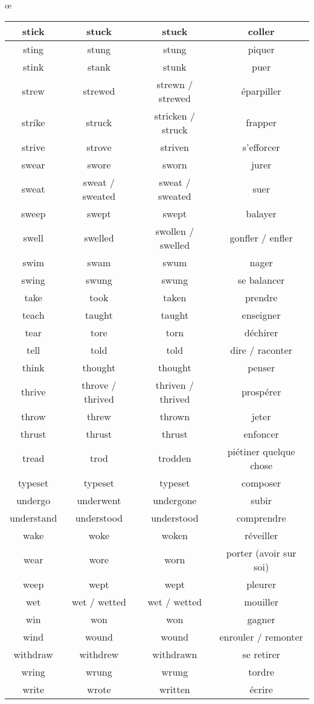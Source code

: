 œ\documentclass[a4paper,12pt,openany]{book}
\begin{document}
\newpage
\begin{tabular}{|c|c|c|c|}
\hline
stick & stuck & stuck & coller\\
\hline
sting & stung & stung & piquer\\
\hline
stink & stank & stunk & puer\\
\hline
strew & strewed & strewn / strewed & éparpiller\\
\hline
strike & struck & stricken / struck & frapper\\
\hline
strive & strove & striven & s’efforcer\\
\hline
swear & swore & sworn & jurer\\
\hline
sweat & sweat / sweated & sweat / sweated & suer\\
\hline
sweep & swept & swept & balayer\\
\hline
swell & swelled & swollen / swelled & gonfler / enfler\\
\hline
swim & swam & swum & nager\\
\hline
swing & swung & swung & se balancer\\
\hline
take & took & taken & prendre\\
\hline
teach & taught & taught & enseigner\\
\hline
tear & tore & torn & déchirer\\
\hline
tell & told & told & dire / raconter\\
\hline
think & thought & thought & penser\\
\hline
thrive & throve / thrived & thriven / thrived & prospérer\\
\hline
throw & threw & thrown & jeter\\
\hline
thrust & thrust & thrust & enfoncer\\
\hline
tread & trod & trodden & piétiner quelque chose\\
\hline
typeset & typeset & typeset & composer\\
\hline
undergo & underwent & undergone & subir\\
\hline
understand & understood & understood & comprendre\\
\hline
wake & woke & woken & réveiller\\
\hline
wear & wore & worn & porter (avoir sur soi)\\
\hline
weep & wept & wept & pleurer\\
\hline
wet & wet / wetted & wet / wetted & mouiller\\
\hline
win & won & won & gagner\\
\hline
wind & wound & wound & enrouler / remonter\\
\hline
withdraw & withdrew & withdrawn & se retirer\\
\hline
wring & wrung & wrung & tordre\\
\hline
write & wrote & written & écrire\\
\hline
\end{tabular}
\end{document}
